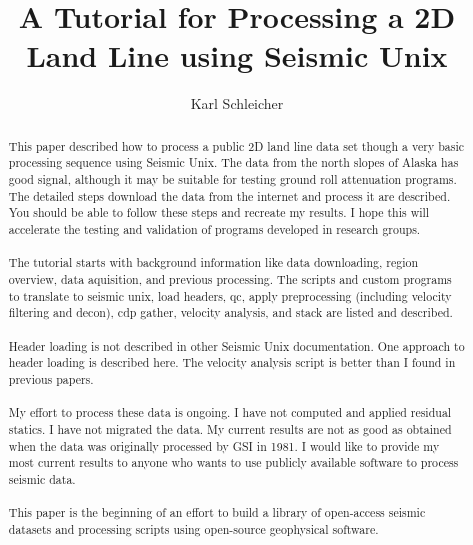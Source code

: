 \title{A Tutorial for Processing a 2D Land Line using Seismic Unix}                                           %
\author{Karl Schleicher}

\maketitle

\begin{abstract}
This paper described how to process a public 2D land line data set though a very basic processing sequence using Seismic Unix. The data from the north slopes of Alaska has good signal, although it may be suitable for testing ground roll attenuation programs.  The detailed steps download the data from the internet and process it are described.  You should be able to follow these steps and recreate my results.  I hope this will accelerate the testing and validation of programs developed in research groups.\\
\\
The tutorial starts with background information like data downloading, region overview, data aquisition, and previous processing.  The scripts and custom programs to translate to seismic unix, load headers, qc, apply preprocessing (including velocity filtering and decon), cdp gather, velocity analysis, and stack are listed and described.\\
\\
Header loading is not described in other Seismic Unix documentation.  One approach to header loading is described here.  The velocity analysis script is better than I found in previous papers.\\
\\
My effort to process these data is ongoing.  I have not computed and applied residual statics.  I have not migrated the data.  My current results are not as good as obtained when the data was originally processed by GSI in 1981.  I would like to provide my most current results to anyone who wants to use publicly available software to process seismic data.\\
\\
This paper is the beginning of an effort to build a library of open-access seismic datasets and processing scripts using open-source geophysical software.\\
\end{abstract}

